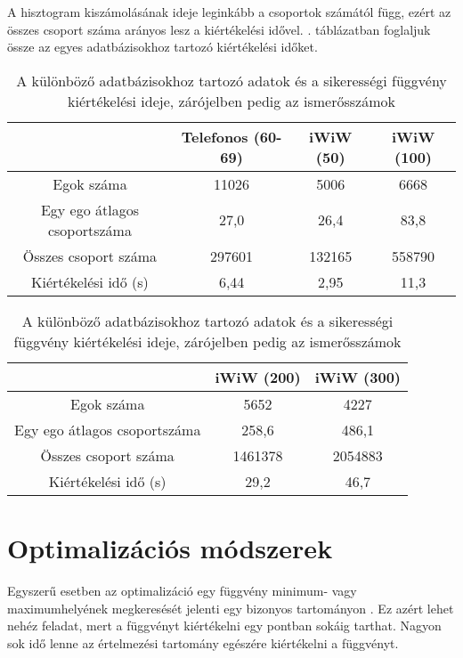 \documentclass[12pt]{article}
\begin{document}
A hisztogram kiszámolásának ideje leginkább a csoportok számától függ, ezért az összes csoport száma arányos lesz a kiértékelési idővel.
. táblázatban foglaljuk össze az egyes adatbázisokhoz tartozó kiértékelési időket.
\begin{table}[H]
	\centering
	\begin{subtable}{1.0\textwidth}
		\centering
		\begin{tabular}{|c|c|c|c|}
			\hline
			& Telefonos (60-69) & iWiW (50) & iWiW (100)  \\
			\hline
			Egok száma & 11026 & 5006 & 6668 \\
			\hline
			Egy ego átlagos csoportszáma & 27,0 & 26,4 & 83,8 \\
			\hline
			Összes csoport száma & 297601 & 132165 & 558790 \\
			\hline
			Kiértékelési idő (s) & 6,44 & 2,95 & 11,3\\
			\hline
		\end{tabular}
		\caption{}
		\label{}
	\end{subtable}
	\newline
	\vspace*{0.5cm} %
	\newline
	\begin{subtable}{1.0\textwidth}
		\centering
		\begin{tabular}{|c|c|c|}
			\hline
			& iWiW (200) & iWiW (300)  \\
			\hline
			Egok száma & 5652 & 4227 \\
			\hline
			Egy ego átlagos csoportszáma & 258,6 & 486,1 \\
			\hline
			Összes csoport száma & 1461378 & 2054883 \\
			\hline
			Kiértékelési idő (s) & 29,2 & 46,7 \\
			\hline
		\end{tabular}
		\caption{}
		\label{}
	\end{subtable}
	\caption{A különböző adatbázisokhoz tartozó adatok és a sikerességi függvény kiértékelési ideje, zárójelben pedig az ismerősszámok}
	\label{csoport_kiertekeles}
\end{table}

\section{Optimalizációs módszerek}
Egyszerű esetben az optimalizáció egy függvény minimum- vagy maximumhelyének megkeresését jelenti egy bizonyos tartományon \cite{Holder}. Ez azért lehet nehéz feladat, mert a függvényt kiértékelni egy pontban sokáig tarthat. Nagyon sok idő lenne az értelmezési tartomány egészére kiértékelni a függvényt.
\end{document}
